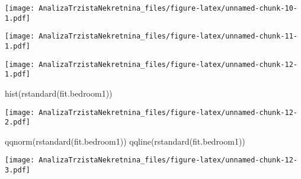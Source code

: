 \documentclass[
]{article}
\newenvironment{Shaded}{\begin{snugshade}}{\end{snugshade}}
\newcommand{\AttributeTok}[1]{\textcolor[rgb]{0.77,0.63,0.00}{#1}}
\newcommand{\FunctionTok}[1]{\textcolor[rgb]{0.00,0.00,0.00}{#1}}
\newcommand{\NormalTok}[1]{#1}
\newcommand{\OtherTok}[1]{\textcolor[rgb]{0.56,0.35,0.01}{#1}}
\newcommand{\SpecialCharTok}[1]{\textcolor[rgb]{0.00,0.00,0.00}{#1}}
\newcommand{\StringTok}[1]{\textcolor[rgb]{0.31,0.60,0.02}{#1}}
\begin{document}
\texttt{[image: AnalizaTrzistaNekretnina\_files/figure-latex/unnamed-chunk-10-1.pdf]}

\begin{Shaded}
\end{Shaded}

\texttt{[image: AnalizaTrzistaNekretnina\_files/figure-latex/unnamed-chunk-11-1.pdf]}

\begin{Shaded}
\end{Shaded}

\texttt{[image: AnalizaTrzistaNekretnina\_files/figure-latex/unnamed-chunk-12-1.pdf]}

\begin{Shaded}
\begin{Highlighting}[]
\FunctionTok{hist}\NormalTok{(}\FunctionTok{rstandard}\NormalTok{(fit.bedroom1))}
\end{Highlighting}
\end{Shaded}

\texttt{[image: AnalizaTrzistaNekretnina\_files/figure-latex/unnamed-chunk-12-2.pdf]}

\begin{Shaded}
\begin{Highlighting}[]
\FunctionTok{qqnorm}\NormalTok{(}\FunctionTok{rstandard}\NormalTok{(fit.bedroom1))}
\FunctionTok{qqline}\NormalTok{(}\FunctionTok{rstandard}\NormalTok{(fit.bedroom1))}
\end{Highlighting}
\end{Shaded}

\texttt{[image: AnalizaTrzistaNekretnina\_files/figure-latex/unnamed-chunk-12-3.pdf]}
\end{document}
